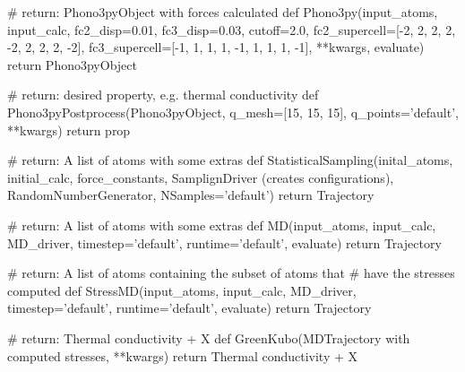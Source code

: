 \documentclass [notitlepage, 12pt, a4paper]{article}
\begin{document}
\begin{python}
# return: Phono3pyObject with forces calculated
def Phono3py(input_atoms, input_calc, {fc2_disp=0.01,
             fc3_disp=0.03, cutoff=2.0,
             fc2_supercell=[-2, 2, 2, 2, -2, 2, 2, 2, -2],
             fc3_supercell=[-1, 1, 1, 1, -1, 1, 1, 1, -1],
             **kwargs}, evaluate)
    return  Phono3pyObject
\end{python}

\begin{python}
# return: desired property, e.g. thermal conductivity
def Phono3pyPostprocess(Phono3pyObject, {q_mesh=[15, 15, 15],
                        q_points='default', **kwargs})
    return prop
\end{python}

\begin{python}
# return: A list of atoms with some extras
def StatisticalSampling(inital_atoms, initial_calc,
        force_constants, SamplignDriver (creates configurations),
        RandomNumberGenerator, NSamples='default')
    return Trajectory
\end{python}

\begin{python}
# return: A list of atoms with some extras
def MD(input_atoms, input_calc, MD_driver,
        timestep='default', runtime='default', evaluate)
    return Trajectory
\end{python}
\newpage
\begin{python}
# return: A list of atoms containing the subset of atoms that
# have the stresses computed
def StressMD(input_atoms, input_calc, MD_driver,
        timestep='default', runtime='default', evaluate)
    return Trajectory
\end{python}

\begin{python}
# return: Thermal conductivity + X
def GreenKubo(MDTrajectory with computed stresses, {**kwargs})
    return Thermal conductivity + X
\end{python}
\end{document}

